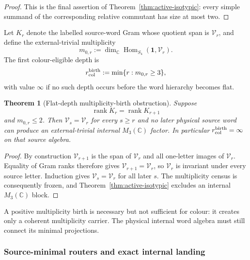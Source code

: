 \documentclass[11pt]{article}
\newtheorem{theorem}{Theorem}[section]
\theoremstyle{definition}
\theoremstyle{remark}
\newcommand{\C}{\mathbb C}
\newcommand{\rank}{\operatorname{rank}}
\newcommand{\Hom}{\operatorname{Hom}}
\begin{document}
\begin{proof}
This is the final assertion of Theorem~\ref{thm:active-isotypic}: every simple
summand of the corresponding relative commutant has size at most two.
\end{proof}

Let $K_r$ denote the labelled source-word Gram whose quotient span is
$\mathcal V_r$, and define the external-trivial multiplicity
\begin{equation}
m_{0,r}:=\dim_\C\Hom_{S_4}(\mathbf1,\mathcal V_r).
\label{eq:trivial-multiplicity}
\end{equation}
The first colour-eligible depth is
\begin{equation}
r_{\rm col}^{\rm birth}
:=
\min\{r:m_{0,r}\ge3\},
\label{eq:colour-birth-depth}
\end{equation}
with value $\infty$ if no such depth occurs before the word hierarchy becomes
flat.

\begin{theorem}[Flat-depth multiplicity-birth obstruction]
\label{thm:flat-depth-colour}
Suppose
\begin{equation}
\rank K_r=\rank K_{r+1}
\label{eq:word-flatness}
\end{equation}
and $m_{0,r}\le2$.  Then $\mathcal V_s=\mathcal V_r$ for every $s\ge r$ and
no later physical source word can produce an external-trivial internal
$M_3(\C)$ factor.  In particular $r_{\rm col}^{\rm birth}=\infty$ on that
source algebra.
\end{theorem}

\begin{proof}
By construction $\mathcal V_{r+1}$ is the span of $\mathcal V_r$ and all
one-letter images of $\mathcal V_r$.  Equality of Gram ranks therefore gives
$\mathcal V_{r+1}=\mathcal V_r$, so $\mathcal V_r$ is invariant under every
source letter.  Induction gives $\mathcal V_s=\mathcal V_r$ for all later
$s$.  The multiplicity census is consequently frozen, and
Theorem~\ref{thm:active-isotypic} excludes an internal $M_3(\C)$ block.
\end{proof}

A positive multiplicity birth is necessary but not sufficient for colour: it
creates only a coherent multiplicity carrier.  The physical internal word
algebra must still connect its minimal projections.

\subsubsection{Source-minimal routers and exact internal landing}
\label{sec:internal-landing}
\end{document}
